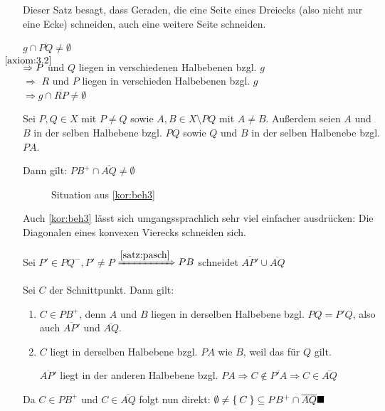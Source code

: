 Dieser Satz besagt, dass Geraden, die eine Seite eines Dreiecks 
(also nicht nur eine Ecke) schneiden, auch eine weitere Seite 
schneiden.

\begin{beweis}
    $g \cap \overline{PQ} \neq \emptyset$\\
    $\overset{\mathclap{\ref{axiom:3.2}}}{\Rightarrow} P$ und $Q$ liegen in verschiedenen Halbebenen bzgl. $g$\\
    $\Rightarrow$ \obda $R$ und $P$ liegen in verschieden
    Halbebenen bzgl. $g$\\
    $\Rightarrow g \cap \overline{RP} \neq \emptyset$
\end{beweis}

\begin{bemerkung}\label{kor:beh3}
    Sei $P, Q \in X$ mit $P \neq Q$ sowie $A, B \in X \setminus PQ$ 
    mit $A \neq B$.
    Außerdem seien $A$ und $B$ in der selben Halbebene bzgl. $PQ$ sowie
    $Q$ und $B$ in der selben Halbenebe bzgl. $PA$.

    Dann gilt: $PB^+ \cap \overline{AQ} \neq \emptyset$
\end{bemerkung}

\begin{figure}[htp]
    \centering
    
    \caption{Situation aus \cref{kor:beh3}}
    \label{fig:geometry-5}
\end{figure}

Auch \cref{kor:beh3} lässt sich umgangssprachlich sehr viel 
einfacher ausdrücken: Die Diagonalen eines konvexen Vierecks 
schneiden sich.

\begin{beweis}%
    Sei $P' \in PQ^-, P' \neq P$
    $\xRightarrow{\cref{satz:pasch}} PB$ schneidet
    $\overline{AP'} \cup \overline{AQ}$

    Sei $C$ der Schnittpunkt. Dann gilt:
    \begin{enumerate}[label=(\roman*)]
        \item $C \in PB^+$, denn $A$ und $B$ liegen in derselben
              Halbebene bzgl. $PQ = P'Q$, also auch
              $\overline{AP'}$ und $\overline{AQ}$.
        \item $C$ liegt in derselben Halbebene bzgl. $PA$ wie
              $B$, weil das für $Q$ gilt.

              $\overline{AP'}$ liegt in der anderen Halbebene
              bzgl. $PA \Rightarrow C \notin \overline{P'A} \Rightarrow C \in \overline{AQ}$
    \end{enumerate}
    Da $C \in PB^+$ und $C \in \overline{AQ}$ folgt nun direkt: 
    $\emptyset \neq \Set{C} \subseteq PB^+ \cap \overline{AQ} \qed$
\end{beweis}

